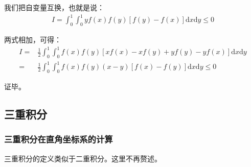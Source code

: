 \documentclass{ctexart}
\begin{document}
我们把自变量互换，也就是说：
\begin{align*}
I=\int_0^1\int_0^1yf(x)f(y)[f(y)-f(x)]\mathrm{d}x\mathrm{d}y\leq0\tag{b} 
\end{align*}

两式相加，可得：
\begin{align*}
I=&\frac{1}{2}\int_0^1\int_0^1f(x)f(y)[xf(x)-xf(y)+yf(y)-yf(x)]\mathrm{d}x\mathrm{d}y\\
=&\frac{1}{2}\int_0^1\int_0^1f(x)f(y)(x-y)[f(x)-f(y)]\mathrm{d}x\mathrm{d}y\leq0
\end{align*}

证毕。

\subsection{三重积分}
\subsubsection{三重积分在直角坐标系的计算}
三重积分的定义类似于二重积分。这里不再赘述。
\end{document}
